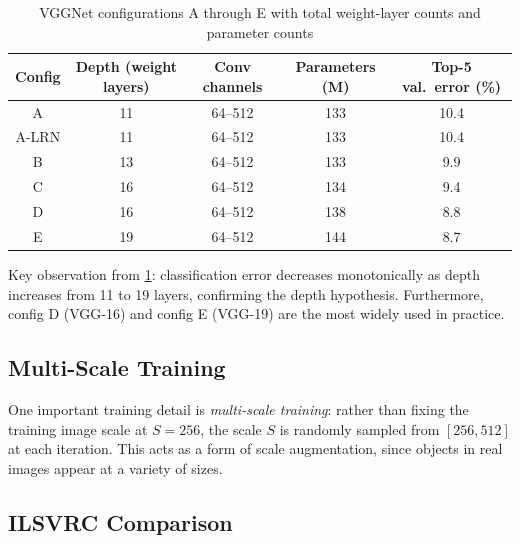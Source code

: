 \documentclass[12pt,a4paper]{article}
\begin{document}
\begin{table}[ht]
\centering
\caption{VGGNet configurations A through E with total weight-layer counts and parameter counts}
\label{tab:vgg_configs}
\begin{tabular}{@{}ccccc@{}}
\toprule
Config & Depth (weight layers) & Conv channels & Parameters (M) & Top-5 val.\ error (\%) \\
\midrule
A      & 11 & 64--512 & 133 & 10.4 \\
A-LRN  & 11 & 64--512 & 133 & 10.4 \\
B      & 13 & 64--512 & 133 & 9.9  \\
C      & 16 & 64--512 & 134 & 9.4  \\
D      & 16 & 64--512 & 138 & 8.8  \\
E      & 19 & 64--512 & 144 & 8.7  \\
\bottomrule
\end{tabular}
\end{table}

\noindent Key observation from \cref{tab:vgg_configs}: classification error decreases monotonically as depth increases from 11 to 19 layers, confirming the depth hypothesis. Furthermore, config D (VGG-16) and config E (VGG-19) are the most widely used in practice.

\subsection{Multi-Scale Training}

One important training detail is \emph{multi-scale training}: rather than fixing the training image scale at $S=256$, the scale $S$ is randomly sampled from $[256, 512]$ at each iteration. This acts as a form of scale augmentation, since objects in real images appear at a variety of sizes.

\subsection{ILSVRC Comparison}
\end{document}
